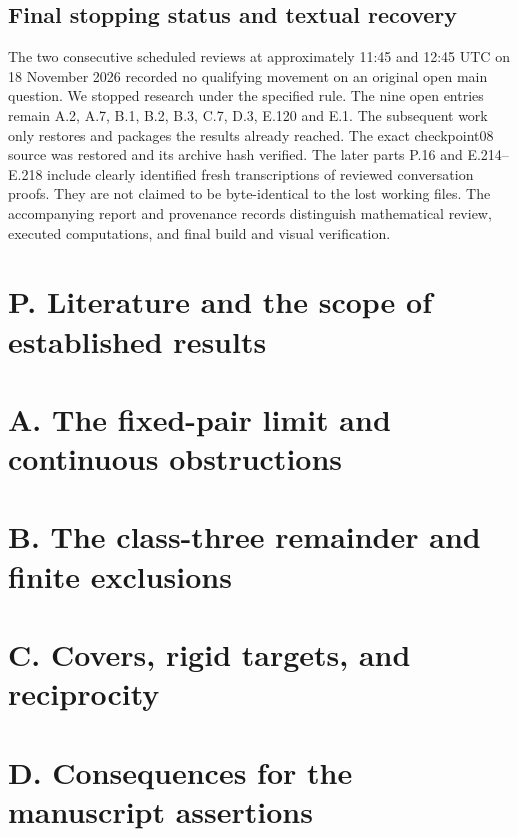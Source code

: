 \documentclass[11pt,a4paper]{article}
\begin{document}
\subsection*{Final stopping status and textual recovery}
The two consecutive scheduled reviews at approximately 11:45 and 12:45 UTC
on 18 November 2026 recorded no qualifying movement on an original open
main question. We stopped research under the specified rule. The nine open
entries remain A.2, A.7, B.1, B.2, B.3, C.7, D.3, E.120 and E.1.
The subsequent work only restores and packages the results already reached.
The exact checkpoint08 source was restored and its archive hash verified.
The later parts P.16 and E.214--E.218 include clearly identified fresh
transcriptions of reviewed conversation proofs. They are not claimed to be
byte-identical to the lost working files. The accompanying report and
provenance records distinguish mathematical review, executed computations,
and final build and visual verification.

\section{P. Literature and the scope of established results}





\section{A. The fixed-pair limit and continuous obstructions}





\section{B. The class-three remainder and finite exclusions}



\section{C. Covers, rigid targets, and reciprocity}

\section{D. Consequences for the manuscript assertions}

\end{document}
